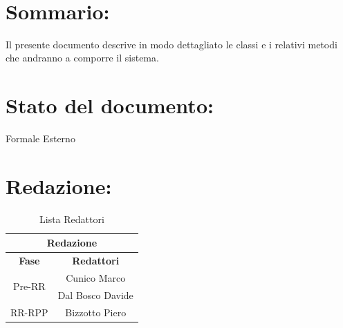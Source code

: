 \newpage

\begin{center} %
	\begin{Huge}	
				\textbf{\TITOLODOC}
			\\
	\end{Huge}
\end{center}

\section*{\LARGE Sommario:} %
Il presente documento descrive in modo dettagliato le classi e i relativi metodi che andranno a comporre il sistema.

\indent \indent

\section*{\LARGE Stato del documento:}
\indent \indent
	Formale Esterno


\section*{\LARGE Redazione:}
	\begin{table}[!h]
		\begin{center}
			\begin{tabular}
				{|c|c|}
				\hline
				\multicolumn{2}{|c|}{ \textbf{Redazione} } \\
				\hline
				\textbf{Fase} & \textbf{Redattori} \\
				\hline
				\multirow{2}{*}{Pre-RR} & Cunico Marco\\
										& Dal Bosco Davide\\
				\hline
				\multirow{1}{*}{RR-RPP} & Bizzotto Piero\\
										
				\hline
			\end{tabular}
			\caption{Lista Redattori} %
			\label{tabredazione}
		\end{center}
	\end{table}
	
